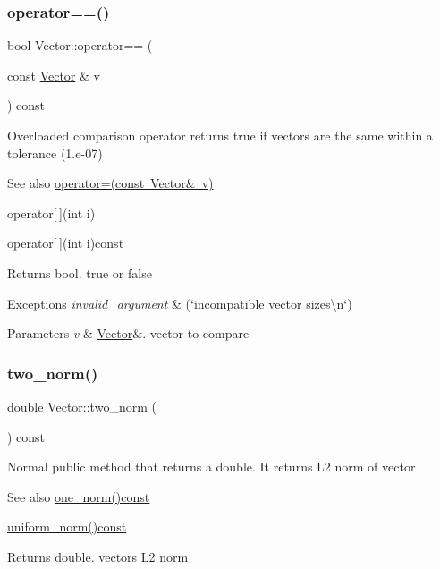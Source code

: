 \subsubsection{\texorpdfstring{operator==()}{operator==()}}
{\footnotesize\ttfamily bool Vector\+::operator== (\begin{DoxyParamCaption}\item[{const \mbox{\hyperlink{classVector}{Vector}} \&}]{v }\end{DoxyParamCaption}) const}

Overloaded comparison operator returns true if vectors are the same within a tolerance (1.\+e-\/07) \begin{DoxySeeAlso}{See also}
\mbox{\hyperlink{classVector_ae48c467a9f65d60e2f7455aba4ca1239}{operator=(const Vector\& v)}} 

operator\mbox{[}$\,$\mbox{]}(int i) 

operator\mbox{[}$\,$\mbox{]}(int i)const 
\end{DoxySeeAlso}
\begin{DoxyReturn}{Returns}
bool. true or false 
\end{DoxyReturn}

\begin{DoxyExceptions}{Exceptions}
{\em invalid\+\_\+argument} & (\char`\"{}incompatible vector sizes\textbackslash{}n\char`\"{}) \\
\hline
\end{DoxyExceptions}

\begin{DoxyParams}{Parameters}
{\em v} & \mbox{\hyperlink{classVector}{Vector}}\&. vector to compare \\
\hline
\end{DoxyParams}
\mbox{\label{classVector_a4f501290a50d057bb6c57ea64d7e70a4}} 
\subsubsection{\texorpdfstring{two\+\_\+norm()}{two\_norm()}}
{\footnotesize\ttfamily double Vector\+::two\+\_\+norm (\begin{DoxyParamCaption}{ }\end{DoxyParamCaption}) const}

Normal public method that returns a double. It returns L2 norm of vector \begin{DoxySeeAlso}{See also}
\mbox{\hyperlink{classVector_a6752a90058ddef427ca6aed12946a737}{one\+\_\+norm()const}} 

\mbox{\hyperlink{classVector_a50b72131eaf3698a9876d99ab6912a32}{uniform\+\_\+norm()const}} 
\end{DoxySeeAlso}
\begin{DoxyReturn}{Returns}
double. vectors L2 norm 
\end{DoxyReturn}
\mbox{\label{classVector_a50b72131eaf3698a9876d99ab6912a32}} 
